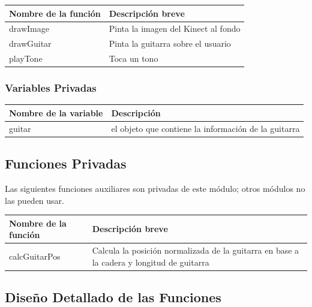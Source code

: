 \documentclass[a4paper,10pt]{article}
\begin{document}
\begin{tabular}{| p{30mm} | p{10cm} |}
        \hline
        \textbf{Nombre de la \mbox{función}} & \textbf{Descripción breve} \\
        \hline
        drawImage & Pinta la imagen del Kinect al fondo \\
        \hline
        drawGuitar & Pinta la guitarra sobre el usuario \\
        \hline
        playTone & Toca un tono \\
        \hline
\end{tabular}

\subsubsection{Variables Privadas}
\begin{tabular}{| p{30mm} | p{10cm} |}
        \hline
        \textbf{Nombre de la \mbox{variable}} & \textbf{Descripción} \\
        \hline
        guitar & el objeto que contiene la información de la guitarra\\
        \hline
\end{tabular}
\subsection{Funciones Privadas}
Las siguientes funciones auxiliares son privadas de este módulo; otros módulos
no las pueden usar.~\\

\begin{tabular}{| p{30mm} | p{10cm} |}
        \hline
        \textbf{Nombre de la \mbox{función}} & \textbf{Descripción breve} \\
        \hline
        calcGuitarPos & Calcula la posición normalizada de la guitarra en base a la cadera y longitud de guitarra \\
        \hline
\end{tabular}
\subsection{Diseño Detallado de las Funciones}
\end{document}
